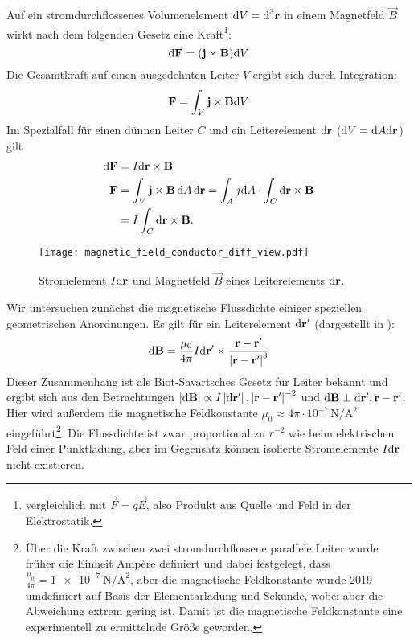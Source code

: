 Auf ein stromdurchflossenes Volumenelement $\text{d} V=\text{d}^3 \mathbf{r}$ in einem Magnetfeld $\vec B$ wirkt nach dem folgenden Gesetz eine Kraft\footnote{vergleichlich mit $\vec {F}=q\vec {E}$, also Produkt aus Quelle und Feld in der Elektrostatik. }:
\begin{equation*}
	\text{d} \mathbf{F}=(\mathbf{j}\times\mathbf{B})\text{d} V
\end{equation*}
Die Gesamtkraft auf einen ausgedehnten Leiter $V$ ergibt sich durch Integration:
\begin{equation*}
	\mathbf{F}=\int _{V}\mathbf{j}\times \mathbf{B}\text{d} V
\end{equation*}
Im Spezialfall für einen dünnen Leiter $C$ und ein Leiterelement $\text{d}\mathbf{r}$ ($\text{d} V = \text{d} A\text{d}\mathbf{r}$) gilt
\begin{align}
    \label{eq:def_magn_flussdichte}
    \text{d} \mathbf{F} &=I\text{d}\mathbf{r}\times\mathbf{B} \\
	\mathbf{F}&=\int _{V}\mathbf{j}\times \mathbf{B}\,\text{d} A \,\text{d}\mathbf{r} = \int_{A}j\text{d} A \cdot \int_C \text{d}\mathbf{r}\times \mathbf{B} \nonumber\\& = I\int_C \text{d}\mathbf{r}\times \mathbf{B} .\nonumber
\end{align}

\begin{figure}[htb]
	\centering
	\texttt{[image: magnetic\_field\_conductor\_diff\_view.pdf]}
	\caption{Stromelement $I\text{d}\mathbf{r}$ und Magnetfeld $\vec B$ eines Leiterelements $\text{d} \mathbf{r}$. }
	\label{fig:magnetic_field_conductor_diff_view}
\end{figure}
Wir untersuchen zunächst die magnetische Flussdichte einiger speziellen geometrischen Anordnungen. Es gilt für ein Leiterelement $\text{d} \mathbf{r}'$ (dargestellt in ):
\begin{equation*}
	\text{d} \mathbf{B}=\frac{\mu _{0}}{4\pi }I\text{d} \mathbf{r}'\times \frac{\mathbf{r}-\mathbf{r}'}{\left| \mathbf{r}-\mathbf{r}'\right| ^{3}}
\end{equation*}
Dieser Zusammenhang ist als Biot-Savartsches Gesetz für Leiter bekannt und ergibt sich aus den Betrachtungen $\left| \text{d} \mathbf{B}\right| \propto I\left| \text{d} \mathbf{r}'\right| , \left| \mathbf{r}-\mathbf{r}'\right| ^{-2}$ und $\text{d} \mathbf{B}\perp \text{d} \mathbf{r}',\mathbf{r}-\mathbf{r}'$. Hier wird außerdem die magnetische Feldkonstante $\mu _{0}\approx 4\pi \cdot 10^{-7}\,\si{\newton\per\square\ampere}$ eingeführt\footnote{Über die Kraft zwischen zwei stromdurchflossene parallele Leiter wurde früher die Einheit Ampère definiert und dabei festgelegt, dass $\frac{\mu _{0}}{4\pi }=\SI{1e-7}{\newton\per\square\ampere}$, aber die magnetische Feldkonstante wurde 2019 umdefiniert auf Basis der Elementarladung und Sekunde, wobei aber die Abweichung extrem gering ist. Damit ist die magnetische Feldkonstante eine experimentell zu ermittelnde Größe geworden. }. Die Flussdichte ist zwar proportional zu $r^{-2}$ wie beim elektrischen Feld einer Punktladung, aber im Gegensatz können isolierte Stromelemente $I\text{d} \mathbf{r}$ nicht existieren.

